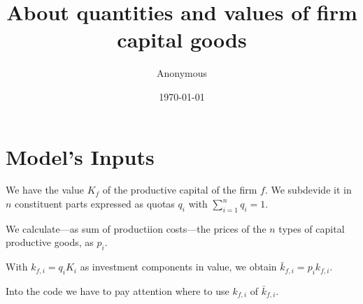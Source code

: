 \documentclass[11pt]{amsart}
\title{About quantities and values of firm capital goods}
\author{Anonymous}
\date{\today}                                           %
\begin{document}
\maketitle

\section{Model's Inputs}

We have the value $K_f$ of the productive capital of the firm $f$. We subdevide it in $n$ constituent parts expressed as quotas $q_i$ with $\sum_{i=1}^{n}  q_i = 1$.

We calculate---as sum of productiion costs---the prices of the $n$ types of capital productive goods, as $p_i$.

With $k_{f,i} = q_i K_i$ as investment components in value, we obtain $\bar{k}_{f,i} =  p_i k_{f,i}$.

Into the code we have to pay attention where to use $k_{f,i}$ of $\bar{k}_{f,i}$.
\end{document}
